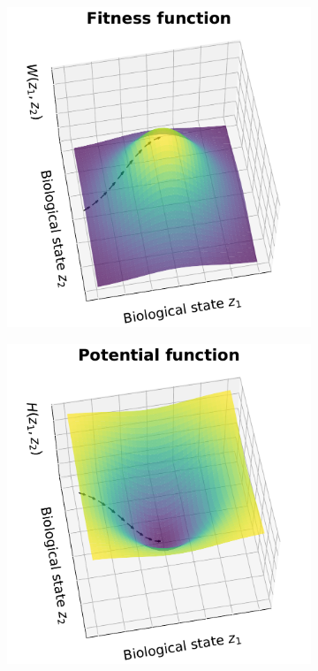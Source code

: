 \documentclass[11pt]{article}
\begin{document}
\begin{figure}[t]
\begin{subfigure}{.5\textwidth}
  \includegraphics[width=1\linewidth]{fitness_function.pdf}
  \caption{}
  \label{fig:s1fig1a}
\end{subfigure}%
\begin{subfigure}{.5\textwidth}
  \includegraphics[width=1\linewidth]{fitness_potential.pdf}

\end{subfigure}
\end{figure}
\end{document}
